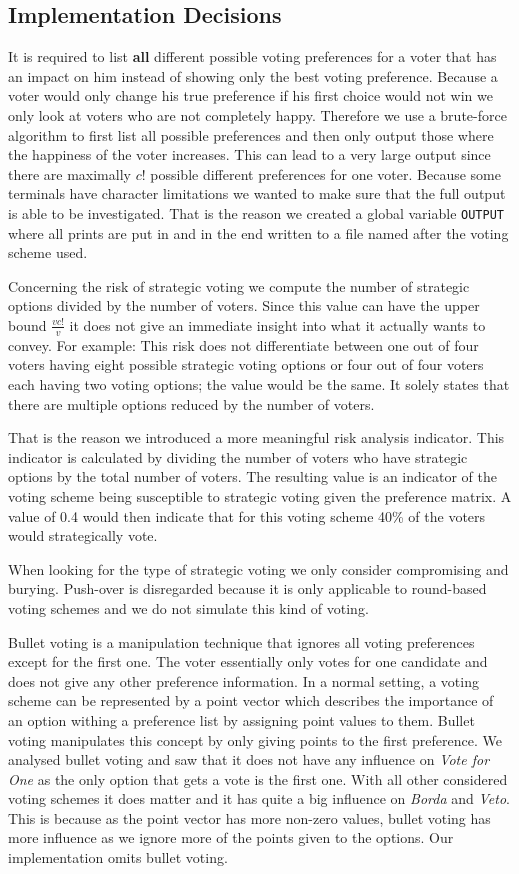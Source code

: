 \subsection{Implementation Decisions}
It is required to list \textbf{all} different possible voting preferences for a voter that has an impact on him instead of showing only the best voting preference. Because a voter would only change his true preference if his first choice would not win we only look at voters who are not completely happy. Therefore we use a brute-force algorithm to first list all possible preferences and then only output those where the happiness of the voter increases. This can lead to a very large output since there are maximally $c!$ possible different preferences for one voter. Because some terminals have character limitations we wanted to make sure that the full output is able to be investigated. That is the reason we created a global variable \texttt{OUTPUT} where all prints are put in and in the end written to a file named after the voting scheme used.

Concerning the risk of strategic voting we compute the number of strategic options divided by the number of voters. Since this value can have the upper bound $\frac{vc!}{v}$ it does not give an immediate insight into what it actually wants to convey. For example: This risk does not differentiate between one out of four voters having eight possible strategic voting options or four out of four voters each having two voting options; the value would be the same. It solely states that there are multiple options reduced by the number of voters.

That is the reason we introduced a more meaningful risk analysis indicator. This indicator is calculated by dividing the number of voters who have strategic options by the total number of voters. The resulting value is an indicator of the voting scheme being susceptible to strategic voting given the preference matrix. A value of 0.4 would then indicate that for this voting scheme 40\% of the voters would strategically vote.

When looking for the type of strategic voting we only consider compromising and burying. Push-over is disregarded because it is only applicable to round-based voting schemes and we do not simulate this kind of voting. 

Bullet voting is a manipulation technique that ignores all voting preferences except for the first one. The voter essentially only votes for one candidate and does not give any other preference information. In a normal setting, a voting scheme can be represented by a point vector which describes the importance of an option withing a preference list by assigning point values to them. Bullet voting manipulates this concept by only giving points to the first preference. We analysed bullet voting and saw that it does not have any influence on \textit{Vote for One} as the only option that gets a vote is the first one. With all other considered voting schemes it does matter and it has quite a big influence on \textit{Borda} and \textit{Veto}. This is because as the point vector has more non-zero values, bullet voting has more influence as we ignore more of the points given to the options. Our implementation omits bullet voting.

